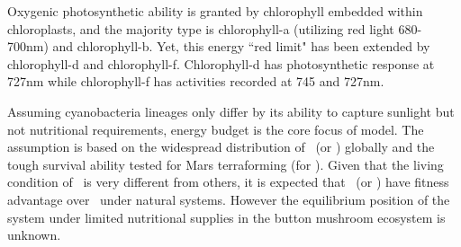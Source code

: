 \documentclass[../thesis.tex]{subfiles} %
\begin{document}
  Oxygenic photosynthetic ability is granted by chlorophyll embedded within chloroplasts, and the majority type is chlorophyll-a (utilizing red light 680-700nm) and chlorophyll-b.  Yet, this energy ``red limit" has been extended by chlorophyll-d and chlorophyll-f.  Chlorophyll-d has photosynthetic response at 727nm while chlorophyll-f has activities recorded at 745 and 727nm.
  
  Assuming cyanobacteria lineages only differ by its ability to capture sunlight but not nutritional requirements,\autocite{giraldo2014plant} energy budget is the core focus of model.  The assumption is based on the widespread distribution of \Ss\ (or \As) globally\autocite{sawa2017electricity,joshi2018bacterial} and the tough survival ability tested for Mars terraforming (for \Cs).\autocite{baque2013boss}  Given that the living condition of \Ct\ is very different from others,\autocite{nurnberg2018photochemistry} it is expected that \As\ (or \Ss) have fitness advantage over \Cs\ under natural systems.  However the equilibrium position of the system under limited nutritional supplies in the button mushroom ecosystem\autocite{joshi2018bacterial} is unknown.
\end{document}
